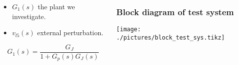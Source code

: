 \begin{frame}
	\begin{columns}
		\begin{column}{0.3\textwidth}
			\begin{itemize}
					\item $G_1(s)$ the plant we investigate.
					\item $v_{l5}(s)$ external perturbation.
			\end{itemize}
			\begin{equation*}
				G_1(s) = \frac{G_{J}}{1+G_p(s)G_J(s)}
			\end{equation*}
		\end{column}
		\begin{column}{0.7\textwidth}
			\frametitle{Block diagram of test system}
			\texttt{[image: ./pictures/block\_test\_sys.tikz]}
		\end{column}
	\end{columns}
\end{frame}
